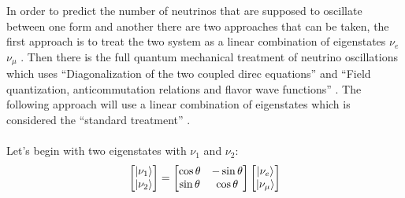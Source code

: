 \documentclass[12pt,a4paper]{article}
\begin{document}
In order to predict the number of neutrinos that are supposed to oscillate between one form and another there are two approaches that can be taken, the first approach is to treat the two system as a linear combination of eigenstates $\nu_e$ $\nu_\mu$ \cite{griffiths2008book}\cite{griffiths2008neutrinoOscillations} \cite{sassaroli1999neutrino}. Then there is the full quantum mechanical treatment of neutrino oscillations which uses ``Diagonalization of the two coupled direc equations'' and ``Field quantization, anticommutation relations and flavor wave functions'' \cite{sassaroli1999neutrino}. The following approach will use a linear combination of eigenstates which is considered the ``standard treatment'' \cite{sassaroli1999neutrino} \cite{griffiths2008book} \cite{griffiths2008neutrinoOscillations}.
\\\\Let's begin with two eigenstates with $\nu_1$ and $\nu_2$: 
\begin{equation}
    \begin{bmatrix}
        \ket{\nu_1} \\
        \ket{\nu_2}
    \end{bmatrix}
    =
    \begin{bmatrix}
        \cos\theta & -\sin\theta \\
        \sin\theta & \cos\theta 
    \end{bmatrix}
        \begin{bmatrix}
        \ket{\nu_e} \\
        \ket{\nu_\mu}
    \end{bmatrix}
    \label{linear_combination_eq_1}
\end{equation}
\end{document}
